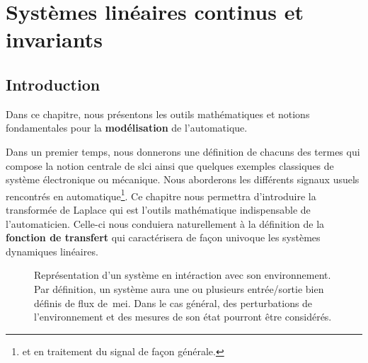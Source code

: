 \chapter[Systèmes linéaires, continus\ldots]{Systèmes linéaires continus et invariants\label{chap-slci}}
\adjustmtc
\minitoc
\newpage
\section{Introduction}
Dans ce chapitre, nous présentons les outils mathématiques 
et notions fondamentales pour la \textbf{modélisation} de l'automatique.

Dans un premier temps, nous donnerons une définition de chacuns 
des termes qui compose la notion centrale de \gls{slci} ainsi que quelques
exemples classiques de système électronique ou mécanique.
Nous aborderons les différents signaux usuels rencontrés
en automatique\footnote{et en traitement du signal de façon générale.}.
Ce chapitre nous permettra d'introduire la transformée de Laplace qui 
est l'outils mathématique indispensable de l'automaticien.
Celle-ci nous conduiera naturellement à la définition 
de la \textbf{fonction de transfert} qui caractérisera de façon univoque 
les systèmes dynamiques linéaires.

\begin{figure}[!h]
\begin{center}
    
\end{center}
\caption{Représentation d'un système en intéraction avec son environnement. 
    Par définition, un système aura une ou plusieurs entrée/sortie bien définis de flux de~\gls{mei}.
    Dans le cas général, des perturbations de l'environnement et des 
    mesures de son état pourront être considérés.\label{fig-systeme}}
\end{figure}

